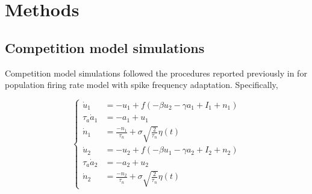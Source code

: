 \documentclass[10pt]{article}
\begin{document}
%   
%   
%

\section*{Methods}
\subsection*{Competition model simulations}
Competition model simulations followed the procedures reported previously in \cite{Shpiro2009} for population firing rate model with spike frequency adaptation. Specifically,

\begin{equation*}
	\begin{cases}
	\dot{u}_1 & = -u_1 +  f(-\beta u_2 - \gamma a_1 + I_1 + n_1) \\
	\tau_a \dot{a}_1 & = -a_1 + u_1\\
	\dot{n}_1 & = \frac{-n_1}{\tau_n} + \sigma \sqrt{\frac{2}{\tau_n}} \eta(t)\\
	\dot{u}_2 & = -u_2 +  f(-\beta u_1 - \gamma a_2 + I_2 + n_2) \\
	\tau_a \dot{a}_2 & = -a_2 + u_2\\
	\dot{n}_2 & = \frac{-n_2}{\tau_n } + \sigma \sqrt{\frac{2}{\tau_n}} \eta(t)
	
	\end{cases}
\end{equation*}
\end{document}
